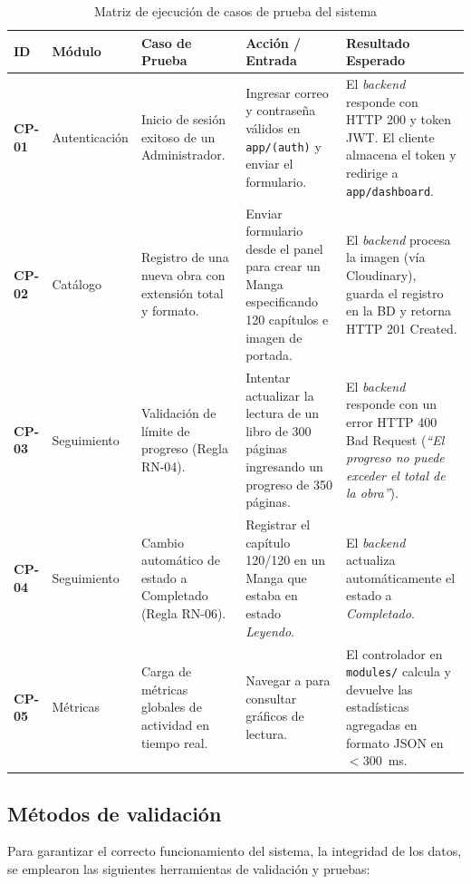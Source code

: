 \documentclass[12pt, atypical, journal]{article}
\begin{document}
\begin{table}[h]
	\centering
	\small
	\caption{Matriz de ejecución de casos de prueba del sistema}
	\label{tab:casos_prueba}
	\begin{tabular}{p{1.2cm}p{2.3cm}p{3.2cm}p{3.5cm}p{3.5cm}}
		\toprule
		\textbf{ID} & \textbf{Módulo} & \textbf{Caso de Prueba} & \textbf{Acción / Entrada} & \textbf{Resultado Esperado} \\
		\midrule
		\textbf{CP-01} & Autenticación & Inicio de sesión exitoso de un Administrador. & Ingresar correo y contraseña válidos en \texttt{app/(auth)} y enviar el formulario. & El \textit{backend} responde con HTTP 200 y token JWT. El cliente almacena el token y redirige a \texttt{app/dashboard}. \\
		\addlinespace
		\textbf{CP-02} & Catálogo & Registro de una nueva obra con extensión total y formato. & Enviar formulario desde el panel para crear un Manga especificando 120 capítulos e imagen de portada. & El \textit{backend} procesa la imagen (vía Cloudinary), guarda el registro en la BD y retorna HTTP 201 Created. \\
		\addlinespace
		\textbf{CP-03} & Seguimiento & Validación de límite de progreso (Regla RN-04). & Intentar actualizar la lectura de un libro de 300 páginas ingresando un progreso de 350 páginas. & El \textit{backend} responde con un error HTTP 400 Bad Request (\textit{``El progreso no puede exceder el total de la obra''}). \\
		\addlinespace
		\textbf{CP-04} & Seguimiento & Cambio automático de estado a Completado (Regla RN-06). & Registrar el capítulo 120/120 en un Manga que estaba en estado \textit{Leyendo}. & El \textit{backend} actualiza automáticamente el estado a \textit{Completado}. \\
		\addlinespace
		\textbf{CP-05} & Métricas & Carga de métricas globales de actividad en tiempo real. & Navegar a para consultar gráficos de lectura. & El controlador en \texttt{modules/} calcula y devuelve las estadísticas agregadas en formato JSON en $< 300$~ms. \\
		\bottomrule
	\end{tabular}
\end{table}

\subsection{Métodos de validación}
Para garantizar el correcto funcionamiento del sistema, la integridad de los datos, se emplearon las siguientes herramientas de validación y pruebas:
\end{document}
